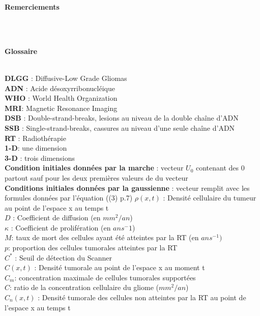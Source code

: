 \documentclass[12pt,a4paper]{article}
\begin{document}
\vspace{4cm}
	\begin {LARGE} 
		\textbf{Remerciements}
	\end {LARGE}
\\
\newpage
\\
	\begin {LARGE} 
		\textbf{Glossaire} 
	\end {LARGE}
\bigskip
\\
\onehalfspacing
\textbf{DLGG} : Diffusive-Low Grade Gliomas\\
\textbf{ADN} : Acide désoxyrribonucléique\\
\textbf{WHO} : World Health Organization \\
\textbf{MRI}: Magnetic Resonance Imaging\\
\textbf{DSB} : Double-strand-breaks, lesions au niveau de la double chaîne d'ADN \\
\textbf{SSB} : Single-strand-breaks, cassures au niveau d'une seule chaîne d'ADN \\
\textbf{RT} : Radiothérapie\\
\textbf{1-D}: une dimension \\
\textbf{3-D} : trois dimensions \\
\textbf{Condition initiales données par la marche} : vecteur $U_0$ contenant des 0 partout sauf pour les deux premières valeurs de du vecteur\\
\textbf{Conditions initiales données par la gaussienne} : vecteur remplit avec les formules données par l'équation ((3) p.7)
\textbf{$\rho(x,t)$} : Densité cellulaire du tumeur au point de l'espace x au temps t \\
\textbf{$D$} : Coefficient de diffusion (en $mm^2/an$)\\
\textbf{$\kappa$} : Coefficient de prolifération (en $ans^-1$)\\
\textbf{$M$}: taux de mort des cellules ayant été atteintes par la RT (en $ans^{-1})$\\
\textbf{$p$}: proportion des cellules tumorales atteintes par la RT\\
\textbf{$C^*$} : Seuil de détection du Scanner\\
\textbf{$C(x,t)$} : Densité tumorale au point de l'espace x au moment t\\
\textbf{$C_m$}: concentration maximale de cellules tumorales supportées\\
\textbf{$C$}: ratio de la concentration cellulaire du gliome ($mm^2/an$)\\
\textbf{$C_n(x,t)$} : Densité tumorale des cellules non atteintes par la RT au point de l'espace x au temps t\\
\end{document}
